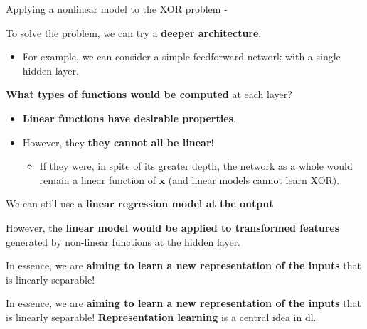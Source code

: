 %
%
%

\begin{frame}[t,allowframebreaks]{Applying a nonlinear model to the XOR problem -} 

    To solve the problem, we can try a {\bf deeper architecture}.
    \begin{itemize}
        \item 
        For example, we can consider a simple feedforward network 
        with a single hidden layer.\\
    \end{itemize}
    \vspace{0.2cm}

    {\bf What types of functions would be computed} at each layer?\\
    \begin{itemize}
    \item
        {\bf Linear functions have desirable properties}.
    \item
        However, they {\bf they cannot all be linear!}    
        \begin{itemize}
            \item 
            If they were, in spite of its greater depth, 
            the network as a whole would remain a linear function of $\mathbf{x}$
            (and linear models cannot learn XOR).
        \end{itemize}
    \end{itemize}
    \vspace{0.2cm}

    We can still use a {\bf linear regression model at the output}.\\
    \vspace{0.2cm}

    However, the {\bf linear model would be applied to transformed features} 
    generated by non-linear functions at the hidden layer.\\
    \vspace{0.2cm}

    In essence, we are {\bf aiming to learn a new representation of the inputs}
    that is linearly separable!\\

    \framebreak

    In essence, we are {\bf aiming to learn a new representation of the inputs}
    that is linearly separable!
    {\bf Representation learning} is a central idea in \gls{dl}.\\


\end{frame}

